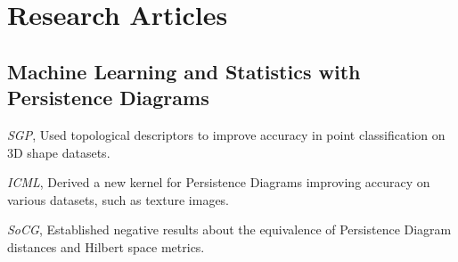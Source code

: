 \documentclass[11pt,a4paper]{moderncv}
\begin{document}
	\section{Research Articles}

	\subsection{Machine Learning and Statistics with Persistence Diagrams}

			  {\small\textit{SGP}, }
                          {}{}{\footnotesize Used topological descriptors to improve accuracy in point classification on 3D shape datasets.}

                          {\small\textit{ICML}, }
			  {}{}{\footnotesize Derived a new kernel for Persistence Diagrams improving accuracy on various datasets, such as texture images. }


                          {\small\textit{SoCG}, }
                          {}{}{\footnotesize Established negative results about the equivalence of Persistence Diagram distances and Hilbert space metrics.}	
\end{document}
